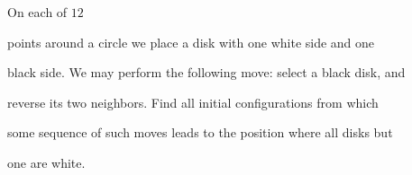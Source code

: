 On each of $ 12$

 points around a circle we place a disk with one white side and one 

black side. We may perform the following move: select a black disk, and 

reverse its two neighbors. Find all initial configurations from which 

some sequence of such moves leads to the position where all disks but 

one are white.